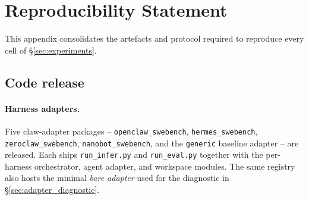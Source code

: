 \documentclass{llmxive}
\begin{document}


\section{Reproducibility Statement}\label{appendix:reproducibility}

This appendix consolidates the artefacts and protocol required to reproduce every cell of \S\ref{sec:experiments}.

\subsection{Code release}

\paragraph{Harness adapters.} Five claw-adapter packages -- \texttt{openclaw\_swebench}, \texttt{hermes\_swebench}, \texttt{zeroclaw\_swebench}, \texttt{nanobot\_swebench}, and the \texttt{generic} baseline adapter -- are released. Each ships \verb|run_infer.py| and \verb|run_eval.py| together with the per-harness orchestrator, agent adapter, and workspace modules. The same registry also hosts the minimal \emph{bare adapter} used for the diagnostic in \S\ref{sec:adapter_diagnostic}.
\end{document}
